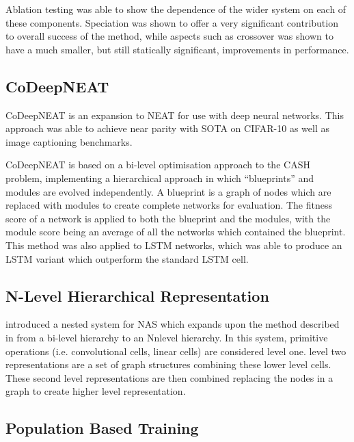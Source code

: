 \documentclass{article}
\begin{document}
		Ablation testing was able to show the dependence of the wider system on each of these components. Speciation was shown to offer a very significant contribution to overall success of the method, while aspects such as crossover was shown to have a much smaller, but still statically significant, improvements in performance.


	\subsection{CoDeepNEAT}

		CoDeepNEAT \cite{25} is an expansion to NEAT for use with deep neural networks. This approach was able to achieve near parity with SOTA on CIFAR-10 as well as image captioning benchmarks. 

		\par
		CoDeepNEAT is based on a bi-level optimisation approach to the CASH problem, implementing a hierarchical approach in which “blueprints” and modules are evolved independently. A blueprint is a graph of nodes which are replaced with modules to create complete networks for evaluation. The fitness score of a network is applied to both the blueprint and the modules, with the module score being an average of all the networks which contained the blueprint. This method was also applied to LSTM networks, which was able to produce an LSTM variant which outperform the standard LSTM cell.


	\subsection{N-Level Hierarchical Representation }

		\cite{4} introduced a nested system for NAS which expands upon the method described in \cite{25} from a bi-level hierarchy to an Nnlevel hierarchy. In this system, primitive operations (i.e. convolutional cells, linear cells) are considered level one. level two representations are a set of graph structures combining these lower level cells. These second level representations are then combined replacing the nodes in a graph to create higher level representation. 


	\subsection{Population Based Training}
\end{document}
